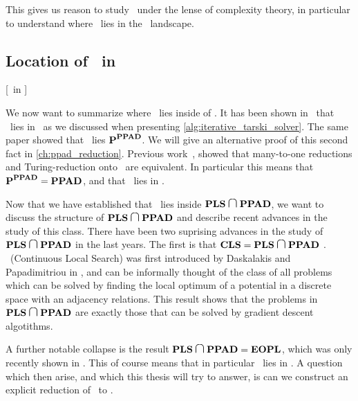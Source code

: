 This gives us reason to study \Tarski\ under the lense of complexity theory, in particular to understand where \Tarski\ lies in the \TFNP\ landscape.

\subsection{Location of \Tarski\ in \TFNP}[\Tarski\ in \TFNP]

We now want to summarize where \Tarski\ lies inside of \TFNP. It has been shown in~\cite{etessami_tarskis_2020} that \Tarski\ lies in \PLS\ as we discussed when presenting \cref{alg:iterative_tarski_solver}. The same paper showed that \Tarski\ lies $\textbf{P}^{\textbf{PPAD}}$. We will give an alternative proof of this second fact in \cref{ch:ppad_reduction}. Previous work~, showed that many-to-one reductions and Turing-reduction onto \PPAD\ are equivalent. In particular this means that $\textbf{P}^{\textbf{PPAD}} = \textbf{PPAD}$, and that \Tarski\ lies in \PPAD{}.

Now that we have established that \Tarski\ lies inside $\PLS \medcap \PPAD$, we want to discuss the structure of $\PLS \medcap \PPAD$ and describe recent advances in the study of this class. There have been two suprising advances in the study of $\PLS \medcap \PPAD$ in the last years. The first is that $\CLS = \PLS \medcap \PPAD$ . \CLS\ (Continuous Local Search) was first introduced by Daskalakis and Papadimitriou in , and can be informally thought of the class of all problems which can be solved by finding the local optimum of a potential in a discrete space with an adjacency relations. This result shows that the problems in $\PLS \medcap \PPAD$ are exactly those that can be solved by gradient descent algotithms.

A further notable collapse is the result $\PLS \medcap \PPAD = \EOPL$, which was only recently shown in . This of course means that in particular \Tarski\ lies in \EOPL. A question which then arise, and which this thesis will try to answer, is can we construct an explicit reduction of \Tarski\ to \EndOfPotentialLine.